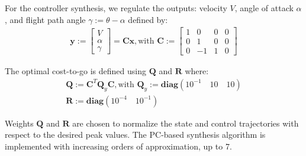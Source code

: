 \documentclass[letterpaper, 10 pt, conference]{ieeeconf}  %
\newcommand{\vo}[1]{\boldsymbol{#1}}
\begin{document}
%


For the controller synthesis, we regulate the outputs: velocity $V$, angle of attack $\alpha$, and flight path angle $\gamma := \theta - \alpha$ defined by:
\begin{align*}
  \vo{y} := \begin{bmatrix}
    V \\
    \alpha \\
    \gamma
\end{bmatrix} = \vo{Cx}, \textrm{with } \vo{C} := \begin{bmatrix}
  1 & 0 & 0 & 0 \\
  0 & 1 & 0 & 0 \\
  0 & -1 & 1 & 0
\end{bmatrix}
\end{align*}

The optimal cost-to-go is defined using $\vo{Q}$ and $\vo{R}$ where:
\begin{gather*}
  \vo{Q} := \vo{C}^T \vo{Q}_y \vo{C}, \textrm{with } \vo{Q}_y := \textbf{diag}(10^{-1} \quad 10 \quad 10{}) \\
  \vo{R} := \textbf{diag}(10^{-4} \quad 10^{-1} )
\end{gather*}

Weights $\vo{Q}$ and $\vo{R}$ are chosen to normalize the state and control trajectories with respect to the desired peak values. The PC-based synthesis algorithm is implemented with increasing orders of approximation, up to 7.


\end{document}
